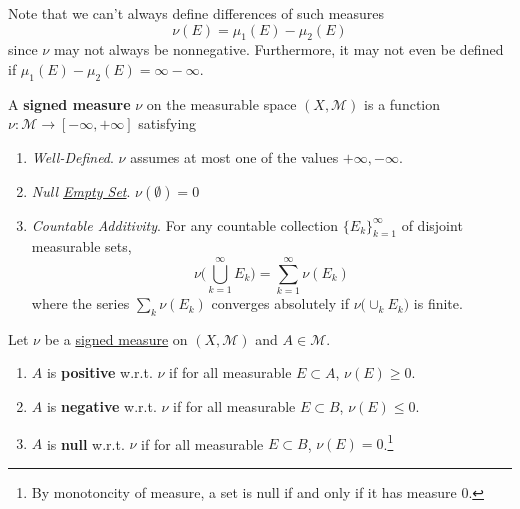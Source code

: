   Note that we can't always define differences of such measures 
  \begin{equation}
    \nu(E) = \mu_1 (E) - \mu_2 (E)
  \end{equation}
  since $\nu$ may not always be nonnegative. Furthermore, it may not even be defined if $\mu_1 (E) - \mu_2 (E) = \infty - \infty$. 

  \begin{definition}
    \label{def:signed-measure}
    A \textbf{signed measure} $\nu$ on the measurable space $(X, \mathcal{M})$ is a function $\nu: \mathcal{M} \to [-\infty, +\infty]$ satisfying 
    \begin{enumerate}
      \item \textit{Well-Defined}. $\nu$ assumes at most one of the values $+\infty, -\infty$. 
      \item \textit{Null \hyperref[st-def:empty-set]{Empty Set}}. $\nu(\emptyset) = 0$ 
      \item \textit{Countable Additivity}. For any countable collection $\{E_k\}_{k=1}^\infty$ of disjoint measurable sets, 
        \begin{equation}
          \nu \bigg( \bigcup_{k=1}^\infty E_k \bigg) = \sum_{k=1}^\infty \nu(E_k)
        \end{equation}
        where the series $\sum_{k} \nu(E_k)$ converges absolutely if $\nu \big( \cup_{k} E_k \big)$ is finite. 
    \end{enumerate}
  \end{definition} 

  \begin{definition}
    \label{def:positive-negative-null-sets}
    Let $\nu$ be a \hyperref[def:signed-measure]{signed measure} on $(X, \mathcal{M})$ and $A \in \mathcal{M}$. 
    \begin{enumerate}
      \item $A$ is \textbf{positive} w.r.t. $\nu$ if for all measurable $E \subset A$, $\nu(E) \geq 0$. 
      \item $A$ is \textbf{negative} w.r.t. $\nu$ if for all measurable $E \subset B$, $\nu(E) \leq 0$. 
      \item $A$ is \textbf{null} w.r.t. $\nu$ if for all measurable $E \subset B$, $\nu(E) = 0$.\footnote{By monotoncity of measure, a set is null if and only if it has measure $0$.}
    \end{enumerate}
  \end{definition}

